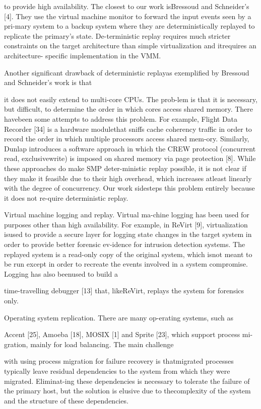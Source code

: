 to provide high availability. The closest to our work isBressoud and Schneider's [4]. They use the virtual machine monitor to forward the input events seen by a pri-mary system to a backup system where they are deterministically replayed to replicate the primary's state. De-terministic replay requires much stricter constraints on
the target architecture than simple virtualization and itrequires an architecture- specific implementation in the
VMM.

Another significant drawback of deterministic replayas exemplified by Bressoud and Schneider's work is that

it does not easily extend to multi-core CPUs. The prob-lem is that it is necessary, but difficult, to determine the
order in which cores access shared memory. There havebeen some attempts to address this problem. For example, Flight Data Recorder [34] is a hardware modulethat sniffs cache coherency traffic in order to record the
order in which multiple processors access shared mem-ory. Similarly, Dunlap introduces a software approach in
which the CREW protocol (concurrent read, exclusivewrite) is imposed on shared memory via page protection [8]. While these approaches do make SMP deter-ministic replay possible, it is not clear if they make it
feasible due to their high overhead, which increases atleast linearly with the degree of concurrency. Our work
sidesteps this problem entirely because it does not re-quire deterministic replay.

Virtual machine logging and replay. Virtual ma-chine logging has been used for purposes other than high
availability. For example, in ReVirt [9], virtualization isused to provide a secure layer for logging state changes
in the target system in order to provide better forensic ev-idence for intrusion detection systems. The replayed system is a read-only copy of the original system, which isnot meant to be run except in order to recreate the events
involved in a system compromise. Logging has also beenused to build a

time-travelling debugger [13] that, likeReVirt, replays the system for forensics only.

Operating system replication. There are many op-erating systems, such as

Accent [25], Amoeba [18],
MOSIX [1] and Sprite [23], which support process mi-gration, mainly for load balancing. The main challenge

with using process migration for failure recovery is thatmigrated processes typically leave residual dependencies
to the system from which they were migrated. Eliminat-ing these dependencies is necessary to tolerate the failure
of the primary host, but the solution is elusive due to thecomplexity of the system and the structure of these dependencies.

